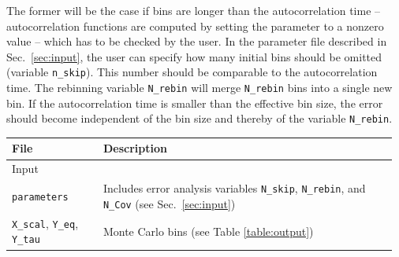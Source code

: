 The former will be the case if bins are  longer than the autocorrelation time -- autocorrelation functions are computed by setting the parameter  to a nonzero value -- which has to be checked by the user.  In the parameter file described in Sec.~\ref{sec:input}, the user  can specify how many initial bins should be omitted (variable \texttt{n\_skip}). This number should be comparable to the autocorrelation time.
The  rebinning  variable \texttt{N\_rebin} will merge \texttt{N\_rebin}  bins into a single new bin. 
If the autocorrelation time  is smaller than the effective bin size, the error should become independent of the bin size and thereby of the variable \texttt{N\_rebin}.
%
\begin{table}[h]
	\begin{center}
		\begin{tabular}{@{} p{0.23\linewidth} p{0.74\linewidth} @{}}\toprule
		File                 & Description  \\ \midrule
		Input                &  \\\midrule %
		\texttt{parameters}  &  Includes error analysis variables \texttt{N\_skip}, \texttt{N\_rebin}, and \texttt{N\_Cov} (see Sec.~\ref{sec:input}) \\
		\texttt{X\_scal}, \texttt{Y\_eq}, \texttt{Y\_tau} & Monte Carlo bins (see Table \ref{table:output}) \vspace{7pt}\\


\end{tabular}
\end{center}
\end{table}
